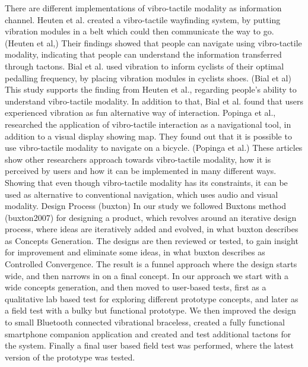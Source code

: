 \documentclass{sigchi}
\begin{document}
\newline
\newline
There are different implementations of vibro-tactile modality as information channel. Heuten et al. created a vibro-tactile wayfinding system, by putting vibration modules in a belt which could then communicate the way to go. (Heuten et al,) Their findings showed that people can navigate using vibro-tactile modality, indicating that people can understand the information transferred through tactons. 
Bial et al. used vibration to inform cyclists of their optimal pedalling frequency, by placing vibration modules in cyclists shoes. (Bial et al) This study supports the finding from Heuten et al., regarding people's ability to understand vibro-tactile modality. In addition to that, Bial et al. found that users experienced vibration as fun alternative way of interaction. 
\newline
\newline
Popinga et al., researched the application of vibro-tactile interaction as a navigational tool, in addition to a visual display showing map. They found out that it is possible to use vibro-tactile modality to navigate on a bicycle. (Popinga et al.)
\newline
\newline
These articles show other researchers approach towards vibro-tactile modality, how it is perceived by users and how it can be implemented in many different ways. Showing that even though vibro-tactile modality has its constraints, it can be used as alternative to conventional navigation, which uses audio and visual modality.
\newline
\newline
Design Process (buxton)
In our study we followed Buxtons method (buxton2007) for designing a product, which revolves around an iterative design process, where ideas are iteratively added and evolved, in what buxton describes as Concepts Generation. The designs are then reviewed or tested, to gain insight for improvement and eliminate some ideas, in what buxton describes as Controlled Convergence. The result is a funnel approach where the design starts wide, and then narrows in on a final concept.
\newline
\newline
In our approach we start with a wide concepts generation, and then moved to user-based tests, first as a qualitative lab based test for exploring different prototype concepts, and later as a field test with a bulky but functional prototype. We then improved the design to small Bluetooth connected vibrational braceless, created a fully functional smartphone companion application and created and test additional tactons for the system. Finally a final user based field test was performed, where the latest version of the prototype was tested. 
\end{document}
